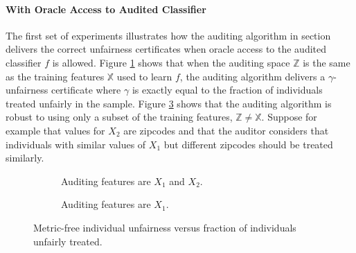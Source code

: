 \documentclass{article}
\begin{document}
\paragraph{With Oracle Access to Audited Classifier}
The first set of experiments illustrates how the auditing algorithm in section delivers the correct unfairness certificates when oracle access to the audited classifier $f$ is allowed. Figure \ref{fig: 1a} shows that when the auditing space $\mathbb{Z}$ is the same as the training features $\mathbb{X}$ used to learn $f$, the auditing algorithm delivers a $\gamma$-unfairness certificate where $\gamma$ is exactly equal to the fraction of individuals treated unfairly in the sample. Figure \ref{fig: 1b} shows that the auditing algorithm is robust to using only a subset of the training features, $\mathbb{Z} \neq \mathbb{X}$. Suppose for example that values for $X_{2}$ are zipcodes and that the auditor considers that individuals with similar values of $X_{1}$ but different zipcodes should be treated similarly. 

\begin{figure}
\begin{subfigure} {.55\linewidth}
\caption{Auditing features are $X_{1}$ and $X_{2}$.}
\label{fig: 1a}
\end{subfigure}
\begin{subfigure} {.55\linewidth}
\caption{Auditing features are $X_{1}$.}
\label{fig: 1b}
\end{subfigure}
\caption{Metric-free individual unfairness versus fraction of individuals unfairly treated.}
\end{figure}
\end{document}
